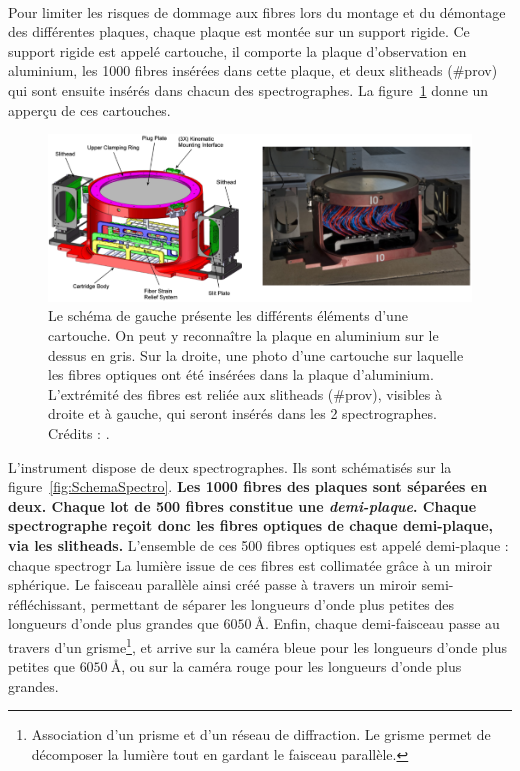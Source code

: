 \documentclass[11pt, twoside, a4paper, openright]{report}
\begin{document}
\paragraph{} Pour limiter les risques de dommage aux fibres lors du montage et du démontage des différentes plaques, chaque plaque est montée sur un support rigide. Ce support rigide est appelé cartouche, il comporte la plaque d'observation en aluminium, les \num{1000} fibres insérées dans cette plaque, et deux slitheads (\#prov) qui sont ensuite insérés dans chacun des spectrographes. La figure~\ref{fig:CartoucheImage} donne un apperçu de ces cartouches.\\
\begin{figure}
  \centering
  \includegraphics[scale=0.35]{CartoucheImage}
  \caption{Le schéma de gauche présente les différents éléments d'une cartouche. On peut y reconnaître la plaque en aluminium sur le dessus en gris. Sur la droite, une photo d'une cartouche sur laquelle les fibres optiques ont été insérées dans la plaque d'aluminium. L'extrémité des fibres est reliée aux slitheads (\#prov), visibles à droite et à gauche, qui seront insérés dans les 2 spectrographes. Crédits : \textcite{Smee2012}.}
  \label{fig:CartoucheImage}
\end{figure}
L'instrument dispose de deux spectrographes. Ils sont schématisés sur la figure~\ref{fig:SchemaSpectro}.
\textbf{Les \num{1000} fibres des plaques sont séparées en deux. Chaque lot de \num{500} fibres constitue une \emph{demi-plaque}. Chaque spectrographe reçoit donc les fibres optiques de chaque demi-plaque, via les slitheads.}
L'ensemble de ces \num{500} fibres optiques est appelé demi-plaque : chaque spectrogr
La lumière issue de ces fibres est collimatée grâce à un miroir sphérique. Le faisceau parallèle ainsi créé passe à travers un miroir semi-réfléchissant, permettant de séparer les longueurs d'onde plus petites des longueurs d'onde plus grandes que $\SI{6050}{\angstrom}$. Enfin, chaque demi-faisceau passe au travers d'un grisme\footnote{Association d'un prisme et d'un réseau de diffraction. Le grisme permet de décomposer la lumière tout en gardant le faisceau parallèle.}, et arrive sur la caméra bleue pour les longueurs d'onde plus petites que $\SI{6050}{\angstrom}$, ou sur la caméra rouge pour les longueurs d'onde plus grandes. 
\end{document}
